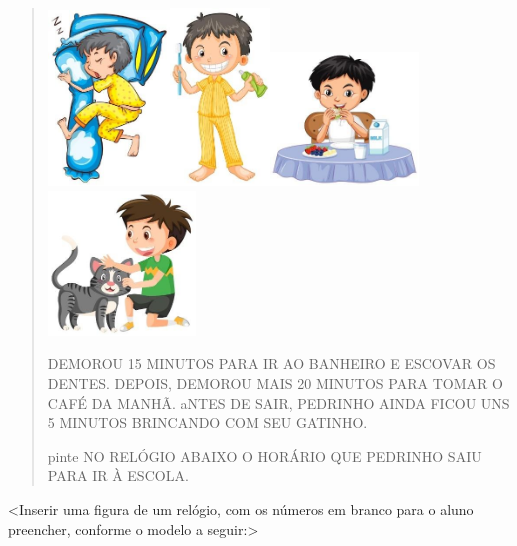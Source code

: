 \begin{quote}
\includegraphics[width=1.27248in,height=1.83120in]{media/image40.jpg}\includegraphics[width=1.04250in,height=1.85399in]{media/image41.jpg}\includegraphics[width=1.54748in,height=1.39171in]{media/image42.jpg}\includegraphics[width=1.54490in,height=1.51274in]{media/image43.jpg}

DEMOROU 15 MINUTOS PARA IR AO BANHEIRO E ESCOVAR OS DENTES. DEPOIS,
DEMOROU MAIS 20 MINUTOS PARA TOMAR O CAFÉ DA MANHÃ. aNTES DE SAIR,
PEDRINHO AINDA FICOU UNS 5 MINUTOS BRINCANDO COM SEU GATINHO.

pinte NO RELÓGIO ABAIXO O HORÁRIO QUE PEDRINHO SAIU PARA IR À ESCOLA.
\end{quote}

\textless{}Inserir uma figura de um relógio, com os números em branco
para o aluno preencher, conforme o modelo a seguir:\textgreater{}

